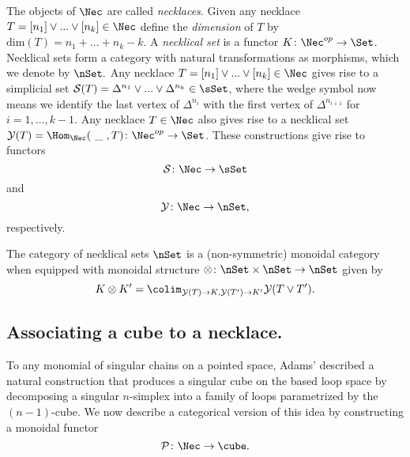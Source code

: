 The objects of $\Nec$ are called \textit{necklaces}. Given any necklace $T=[n_1] \vee ... \vee[n_k] \in \Nec$ define the \textit{dimension} of $T$ by $\text{dim}(T)=n_1+ ...+n_k-k$. A \textit{necklical set} is a functor $K \colon \Nec^{op} \to \Set$. Necklical sets form a category with natural transformations as morphisms, which we denote by $\nSet.$ Any necklace $T=[n_1] \vee ... \vee[n_k] \in \Nec$ gives rise to a simplicial set $\mathcal{S}(T)= \Delta^{n_1} \vee... \vee \Delta^{n_k} \in \sSet$, where the wedge symbol now means we identify the last vertex of $\Delta^{n_i}$ with the first vertex of $\Delta^{n_{i+1}}$ for $i=1,\dots,k-1$. Any necklace $T \in \Nec$ also gives rise to a necklical set $\mathcal{Y}(T)=\Hom_{\Nec}(\text{ \_ }, T) \colon \Nec^{op} \to \Set$. These constructions give rise to functors 
$$\mathcal{S} \colon \Nec \to \sSet$$
and
$$\mathcal{Y} \colon \Nec \to \nSet,$$ respectively. 

The category of necklical sets $\nSet$ is a (non-symmetric) monoidal category when equipped with monoidal structure $\otimes\colon \nSet \times \nSet \to \nSet$ given by $$K \otimes K' = \colim_{\mathcal{Y}(T) \to K, \mathcal{Y}(T')\to K'} \mathcal{Y}(T \vee T').$$

\subsection{Associating a cube to a necklace.}

To any monomial of singular chains on a pointed space, Adams' described a natural construction that produces a singular cube on the based loop space by decomposing a singular $n$-simplex into a family of loops parametrized by the $(n-1)$-cube.  We now describe a categorical version of this idea by constructing a monoidal functor
$$\mathcal{P} \colon \Nec \to \cube.$$

